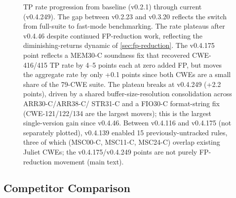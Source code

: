 \begin{figure}[t]
\centering
{}
\caption{TP rate progression from baseline (v0.2.1) through current
(v0.4.249).  The gap between v0.2.23 and v0.3.20 reflects the switch
from full-suite to fast-mode benchmarking.  The rate plateaus after
v0.4.46 despite continued FP-reduction work, reflecting the
diminishing-returns dynamic of \cref{sec:fp-reduction}.  The v0.4.175
point reflects a MEM30-C soundness fix that recovered CWE-416/415 TP
rate by 4--5 points each at zero added FP, but moves the aggregate
rate by only +0.1 points since both CWEs are a small share of the
79-CWE suite.  The plateau breaks at v0.4.249 (+2.2 points), driven by
a shared buffer-size-resolution consolidation across ARR30-C/ARR38-C/
STR31-C and a FIO30-C format-string fix (CWE-121/122/134 are the
largest movers); this is the largest single-version gain since
v0.4.46.  Between v0.4.116 and v0.4.175 (not separately plotted),
v0.4.139 enabled 15 previously-untracked rules, three of which
(MSC00-C, MSC11-C, MSC24-C) overlap existing Juliet CWEs; the
v0.4.175/v0.4.249 points are not purely FP-reduction movement (main
text).}
\label{fig:tp-rate-progression}
\end{figure}

\subsection{Competitor Comparison}
\label{sec:competitor}


